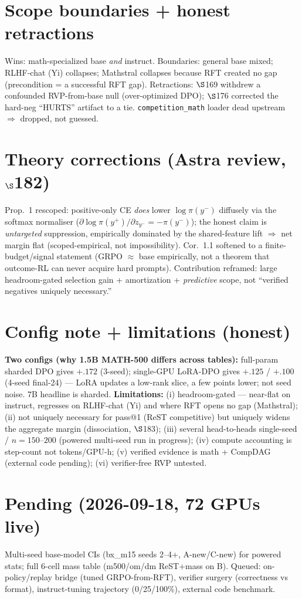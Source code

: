 \documentclass[a4paper,10pt]{article}
\begin{document}
\section{Scope boundaries + honest retractions}
Wins: math-specialized base \emph{and} instruct. Boundaries: general base mixed; RLHF-chat (Yi) collapses;
Mathstral collapses because RFT created no gap (precondition = a successful RFT gap). Retractions: $\S$169
withdrew a confounded RVP-from-base null (over-optimized DPO); $\S$176 corrected the hard-neg ``HURTS''
artifact to a tie. \texttt{competition\_math} loader dead upstream $\Rightarrow$ dropped, not guessed.

\section{Theory corrections (Astra review, $\S$182)}
Prop.~1 rescoped: positive-only CE \emph{does} lower $\log\pi(y^-)$ diffusely via the softmax normaliser
($\partial\log\pi(y^+)/\partial z_{y^-}=-\pi(y^-)$); the honest claim is \emph{untargeted} suppression,
empirically dominated by the shared-feature lift $\Rightarrow$ net margin flat (scoped-empirical, not
impossibility). Cor.~1.1 softened to a finite-budget/signal statement (GRPO $\approx$ base empirically, not
a theorem that outcome-RL can never acquire hard prompts). Contribution reframed: large headroom-gated
selection gain + amortization + \emph{predictive} scope, not ``verified negatives uniquely necessary.''

\section{Config note + limitations (honest)}
\textbf{Two configs (why 1.5B MATH-500 differs across tables):} full-param sharded DPO gives $+.172$
(3-seed); single-GPU LoRA-DPO gives $+.125$ / $+.100$ (4-seed final-24) --- LoRA updates a low-rank slice,
a few points lower; not seed noise. 7B headline is sharded. \textbf{Limitations:} (i) headroom-gated ---
near-flat on instruct, regresses on RLHF-chat (Yi) and where RFT opens no gap (Mathstral); (ii) not
uniquely necessary for pass@1 (ReST competitive) but uniquely widens the aggregate margin (dissociation,
$\S$183); (iii) several head-to-heads single-seed / $n{=}150$--$200$ (powered multi-seed run in progress);
(iv) compute accounting is step-count not tokens/GPU-h; (v) verified evidence is math + CompDAG (external
code pending); (vi) verifier-free RVP untested.

\section*{Pending (2026-09-18, 72 GPUs live)}
Multi-seed base-model CIs (bx\_m15 seeds 2--4+, A-new/C-new) for powered stats; full 6-cell mass table
(m500/om/dm ReST+mass on B). Queued: on-policy/replay bridge (tuned GRPO-from-RFT), verifier surgery
(correctness vs format), instruct-tuning trajectory (0/25/100\%), external code benchmark.
\end{document}
